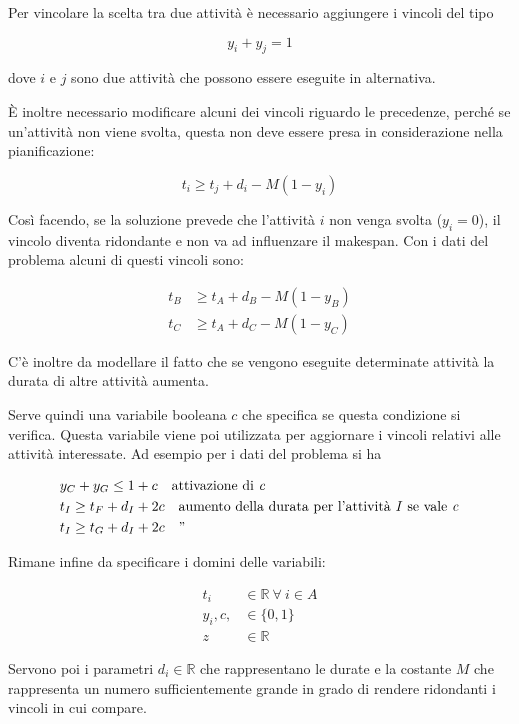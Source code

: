 Per vincolare la scelta tra due attività è necessario aggiungere i vincoli del tipo

$$
y_i + y_j = 1
$$

\noindent dove $i$ e $j$ sono due attività che possono essere eseguite in alternativa.

\`E inoltre necessario modificare alcuni dei vincoli riguardo le precedenze, perché se un'attività non viene svolta, questa non deve essere presa in considerazione nella pianificazione:

$$
t_i \geq t_{j} + d_i - M(1 - y_i)
$$ 

\noindent Così facendo, se la soluzione prevede che l'attività $i$ non venga svolta ($y_i = 0$), il vincolo diventa ridondante e non va ad influenzare il makespan.
Con i dati del problema alcuni di questi vincoli sono:

\begin{align*}
	t_B &\geq t_{A} + d_B - M(1 - y_B) \\
	t_C &\geq t_{A} + d_C - M(1 - y_C)
\end{align*}

C'è inoltre da modellare il fatto che se vengono eseguite determinate attività la durata di altre attività aumenta.

Serve quindi una variabile booleana $c$ che specifica se questa condizione si verifica. Questa variabile viene poi utilizzata per aggiornare i vincoli relativi alle attività interessate. Ad esempio per i dati del problema si ha

\begin{align*}
	&y_C + y_G \leq 1 + c \quad \text{attivazione di \textit{c}} \\
	&t_I \geq t_F + d_I + 2c \quad \text{aumento della durata per l'attività \textit{I} se vale \textit{c}} \\ 
	&t_I \geq t_G + d_I + 2c \quad \text{''} \\
\end{align*}

\noindent Rimane infine da specificare i domini delle variabili:

\begin{align*}
	t_i &\in \mathbb{R} \: \forall \: i \in A \\
	y_i, c, &\in \{0,1\} \\
	z &\in \mathbb{R}
\end{align*}

\noindent Servono poi i parametri $d_i \in \mathbb{R}$ che rappresentano le durate e la costante $M$ che rappresenta un numero sufficientemente grande in grado di rendere ridondanti i vincoli in cui compare.

